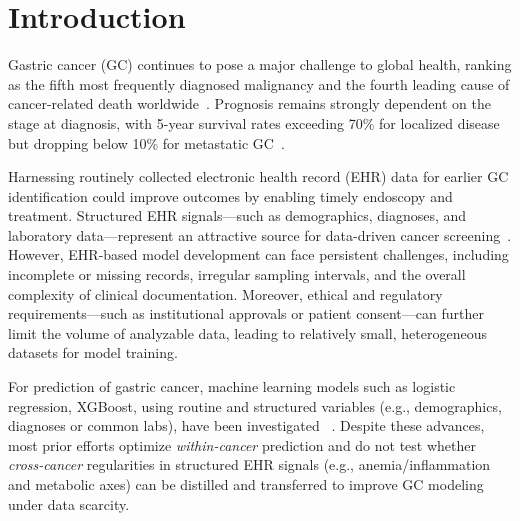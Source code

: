 \documentclass[diagnostics,article,submit,pdftex,moreauthors]{Definitions/mdpi}
\begin{document}
\newcommand{\GC}{\mathrm{GC}}
\newcommand{\CC}{\mathrm{CC}}
\newcommand{\EC}{\mathrm{EC}}
\newcommand{\LC}{\mathrm{LC}}
\newcommand{\PC}{\mathrm{PC}}
\newcommand{\encP}{\phi}  %
\newcommand{\enc}[1]{f_{#1}}
\newcommand{\headP}[1]{\theta_{#1}}
\newcommand{\head}[1]{h_{\headP{#1}}}
\newcommand{\pretrainP}{\encP^\star}
\newcommand{\preDecayC}{\lambda_{\mathrm{pre}}}  %
\newcommand{\ftDecayC}{\lambda_{\mathrm{ft}}}  %
\section{Introduction}
Gastric cancer (GC) continues to pose a major challenge to global health, 
ranking as the fifth most frequently diagnosed malignancy and the fourth leading cause of cancer-related death worldwide~\citep{park2024SHapley}. 
Prognosis remains strongly dependent on the stage at diagnosis, 
with 5-year survival rates exceeding 70\% for localized disease but dropping below 10\% for metastatic GC~\citep{NCI2023stomach}.

Harnessing routinely collected electronic health record (EHR) data for earlier GC identification could improve outcomes by enabling timely endoscopy and treatment.
Structured EHR signals—such as demographics, diagnoses, and laboratory data—represent an attractive source for data-driven cancer screening~\citep{read2023cancers,huang2022jco}.
However, EHR-based model development can face persistent challenges, including incomplete or missing records, irregular sampling intervals, and the overall complexity of clinical documentation.
Moreover, ethical and regulatory requirements—such as institutional approvals or patient consent—can further limit the volume of analyzable data, 
leading to relatively small, heterogeneous datasets for model training.

For prediction of gastric cancer, machine learning models such as logistic regression, XGBoost, using routine and structured variables (e.g., demographics, diagnoses or common labs), have been investigated ~\citep{park2024SHapley,huang2022jco,Kim2024EHRGC}.
Despite these advances, most prior efforts optimize \emph{within-cancer} prediction and do not test whether \emph{cross-cancer} regularities in structured EHR signals (e.g., anemia/inflammation and metabolic axes) can be distilled and transferred to improve GC modeling under data scarcity.
\end{document}
